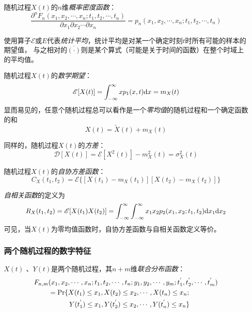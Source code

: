     随机过程$X(t)$的$n$维\emph{概率密度函数}：
    \begin{equation}
        \frac{\partial^n F_n(x_1,x_2,\cdots,x_n;t_1,t_2,\cdots,t_n)}{\partial x_1\partial x_2\cdots\partial x_n}=p_n(x_1,x_2,\cdots,x_n;t_1,t_2,\cdots,t_n)
    \end{equation}

    使用算子$\mathscr{E}$或$E$代表\emph{统计平均}，统计平均是对某一个确定时刻$t$时所有可能的样本的期望值，
    与之相对的$\overline{(\cdot)}$则是某个算式（可能是关于时间的函数）在整个时域上的平均值。

    随机过程$X(t)$的\emph{数学期望}：
    \begin{equation}
        \mathscr{E}[X(t)]=\int_{-\infty}^{\infty}xp_1(x,t)\text{\upshape d} x=m_X(t)
    \end{equation}
    显而易见的，任意个随机过程总可以看作是一个\emph{零均值}的随机过程和一个确定函数的和
    \begin{equation}
        X(t)=\widetilde{X}(t)+m_X(t)
    \end{equation}

    同样的，随机过程$X(t)$的\emph{方差}：
    \begin{equation}
        \mathscr{D}[X(t)]=\mathscr{E}[X^2(t)]-m_X^2(t)=\sigma_X^2(t)
    \end{equation}

    随机过程$X(t)$的\emph{自协方差函数}：
    \begin{equation}
        C_X(t_1,t_2)=\mathscr{E}\{[X(t_1)-m_X(t_1)][X(t_2)-m_X(t_2)]\}
    \end{equation}

    \emph{自相关函数}的定义为
    \begin{equation}
        R_X(t_1,t_2)=\mathscr{E}[X(t_1)X(t_2)]=\int_{-\infty}^{\infty}\int_{-\infty}^{\infty}x_1x_2p_2(x_1,x_2;t_1,t_2)\text{\upshape d} x_1\text{\upshape d} x_2 
    \end{equation}
    可见，当$X(t)$为零均值函数时，自协方差函数与自相关函数定义等价。

    \subsubsection{两个随机过程的数字特征}
    $X(t)$ 、$Y(t)$是两个随机过程，其$n+m$维\emph{联合分布函数}：
    \begin{equation}
        \begin{split}
            &F_{n,m}(x_1,x_2,\cdots,x_n;t_1,t_2,\cdots,t_n;y_1,y_2,\cdots,y_m;t^{'}_1,t^{'}_2,\cdots,t^{'}_m)\\
            &\phantom{F_{n,m}}=\text{Pr}\{ X(t_1)\leq x_1,X(t_2)\leq x_2,\cdots ,X(t_n)\leq x_n;\phantom{\}}\\
            &\phantom{ F_{n,m}=\text{Pr}\{\thinspace}Y(t^{'}_1)\leq x_1,Y(t^{'}_2)\leq x_2,\cdots ,Y(t^{'}_n)\leq x_n\}
        \end{split}
    \end{equation}

